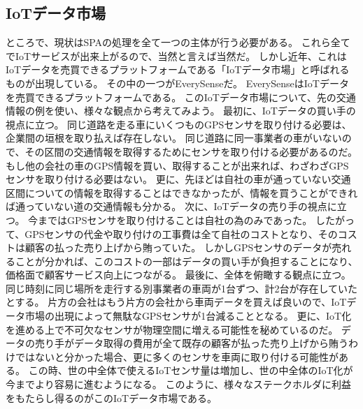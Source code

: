 \subsection{IoTデータ市場}
ところで、現状はSPAの処理を全て一つの主体が行う必要がある。
これら全てでIoTサービスが出来上がるので、当然と言えば当然だ。
しかし近年、これはIoTデータを売買できるプラットフォームである「IoTデータ市場」と呼ばれるものが出現している。
その中の一つがEverySense\cite{everysense}だ。
EverySenseはIoTデータを売買できるプラットフォームである。
このIoTデータ市場について、先の交通情報の例を使い、様々な観点から考えてみよう。
最初に、IoTデータの買い手の視点に立つ。
同じ道路を走る車にいくつものGPSセンサを取り付ける必要は、企業間の垣根を取り払えば存在しない。
同じ道路に同一事業者の車がいないので、その区間の交通情報を取得するためにセンサを取り付ける必要があるのだ。
もし他の会社の車のGPS情報を買い、取得することが出来れば、わざわざGPSセンサを取り付ける必要はない。
更に、先ほどは自社の車が通っていない交通区間についての情報を取得することはできなかったが、情報を買うことができれば通っていない道の交通情報も分かる。
次に、IoTデータの売り手の視点に立つ。
今まではGPSセンサを取り付けることは自社の為のみであった。
したがって、GPSセンサの代金や取り付けの工事費は全て自社のコストとなり、そのコストは顧客の払った売り上げから賄っていた。
しかしGPSセンサのデータが売れることが分かれば、このコストの一部はデータの買い手が負担することになり、価格面で顧客サービス向上につながる。
最後に、全体を俯瞰する観点に立つ。
同じ時刻に同じ場所を走行する別事業者の車両が1台ずつ、計2台が存在していたとする。
片方の会社はもう片方の会社から車両データを買えば良いので、IoTデータ市場の出現によって無駄なGPSセンサが1台減ることとなる。
更に、IoT化を進める上で不可欠なセンサが物理空間に増える可能性を秘めているのだ。
データの売り手がデータ取得の費用が全て既存の顧客が払った売り上げから賄うわけではないと分かった場合、更に多くのセンサを車両に取り付ける可能性がある。
この時、世の中全体で使えるIoTセンサ量は増加し、世の中全体のIoT化が今までより容易に進むようになる。
このように、様々なステークホルダに利益をもたらし得るのがこのIoTデータ市場である。

